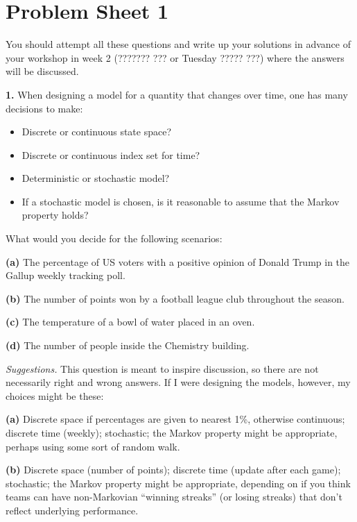 \documentclass[
  a4paper,
]{article}
\providecommand{\tightlist}{%
  \setlength{\itemsep}{0pt}\setlength{\parskip}{0pt}}
\theoremstyle{definition}
\theoremstyle{definition}
\theoremstyle{definition}
\theoremstyle{remark}
\begin{document}
\hypertarget{P01}{%
\section*{Problem Sheet 1}\label{P01}}

You should attempt all these questions and write up your solutions in advance of your workshop in week 2 (??????? ??? or Tuesday ????? ???) where the answers will be discussed.

\textbf{1.} When designing a model for a quantity that changes over time, one has many decisions to make:

\begin{itemize}
\tightlist
\item
  Discrete or continuous state space?
\item
  Discrete or continuous index set for time?
\item
  Deterministic or stochastic model?
\item
  If a stochastic model is chosen, is it reasonable to assume that the Markov property holds?
\end{itemize}

What would you decide for the following scenarios:

\textbf{(a)} The percentage of US voters with a positive opinion of Donald Trump in the Gallup weekly tracking poll.

\textbf{(b)} The number of points won by a football league club throughout the season.

\textbf{(c)} The temperature of a bowl of water placed in an oven.

\textbf{(d)} The number of people inside the Chemistry building.

\emph{Suggestions.} This question is meant to inspire discussion, so there are not necessarily right and wrong answers. If I were designing the models, however, my choices might be these:

\textbf{(a)} Discrete space if percentages are given to nearest 1\%, otherwise continuous; discrete time (weekly); stochastic; the Markov property might be appropriate, perhaps using some sort of random walk.

\textbf{(b)} Discrete space (number of points); discrete time (update after each game); stochastic; the Markov property might be appropriate, depending on if you think teams can have non-Markovian ``winning streaks'' (or losing streaks) that don't reflect underlying performance.
\end{document}

